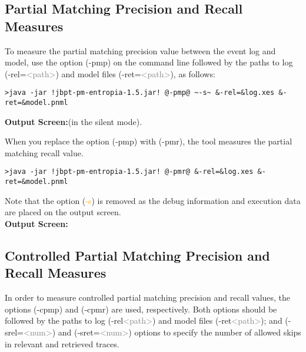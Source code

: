 \subsection{Partial Matching Precision and Recall Measures}
To measure the partial matching precision value between the event log and model, use the option (\textcolor{darkcandyapplered}{\footnotesize\ttfamily-pmp}) on the command line followed by the paths to log (\textcolor{ao}{\footnotesize\ttfamily-rel=}\textcolor{gray}{\footnotesize\ttfamily<path>}) and model files (\textcolor{ao}{\footnotesize\ttfamily-ret=}\textcolor{gray}{\footnotesize\ttfamily<path>}), as follows: 
\begin{lstlisting}[style=CL]
>java -jar !jbpt-pm-entropia-1.5.jar! @-pmp@ ~-s~ &-rel=&log.xes &-ret=&model.pnml
\end{lstlisting}
\textbf{Output Screen:}(in the silent mode).

When you replace the option (\textcolor{darkcandyapplered}{\footnotesize\ttfamily-pmp}) with (\textcolor{darkcandyapplered}{\footnotesize\ttfamily-pmr}), the tool measures the partial matching recall value.
\begin{lstlisting}[style=CL]
>java -jar !jbpt-pm-entropia-1.5.jar! @-pmr@ &-rel=&log.xes &-ret=&model.pnml
\end{lstlisting}
Note that the option (\textcolor{orange}{\footnotesize\ttfamily-s}) is removed as the debug information and execution data are placed on the output screen. \\
\textbf{Output Screen:}


\subsection{Controlled Partial Matching Precision and Recall Measures}
In order to measure controlled partial matching precision and recall values, the options (\textcolor{darkcandyapplered}{\footnotesize\ttfamily-cpmp}) and (\textcolor{darkcandyapplered}{\footnotesize\ttfamily-cpmr}) are used, respectively. Both options should be followed by the paths to log (\textcolor{ao}{\footnotesize\ttfamily-rel}\textcolor{gray}{\footnotesize\ttfamily<path>}) and model files (\textcolor{ao}{\footnotesize\ttfamily-ret}\textcolor{gray}{\footnotesize\ttfamily<path>}); and (\textcolor{ao}{\footnotesize\ttfamily-srel=}\textcolor{gray}{\footnotesize\ttfamily<num>}) and (\textcolor{ao}{\footnotesize\ttfamily-sret=}\textcolor{gray}{\footnotesize\ttfamily<num>}) options to specify the number of allowed skips in relevant and retrieved traces. 

